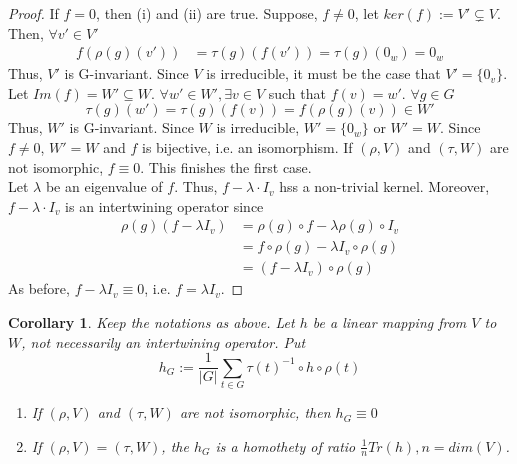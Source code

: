 \documentclass[letterpaper, leqno, 12pt]{article}
\providecommand{\abs}[1]{\left\lvert#1\right\rvert}
\newcommand {\repV} {(\rho,V)}
\newcommand {\repW} {(\tau,W)}
\theoremstyle{stdthm}
\newtheorem{cor}[thm]{Corollary}
\theoremstyle{stddef}
\theoremstyle{stdnonum}
\theoremstyle{stdqands}
\theoremstyle{stdbold}
\begin{document}
\begin{proof}
If $f=0$, then (i) and (ii) are true. Suppose, $f \neq 0$, let $ker(f) := V' \subsetneq V$. Then, $\forall v' \in V'$ 
\begin{align*}
f(\rho(g)(v')) &= \tau(g) (f(v')) = \tau(g)(0_w)= 0_w
\end{align*} 
Thus, $V'$ is G-invariant. Since $V$ is irreducible, it must be the case that $V' = \{0_v\}$. \\

\noindent Let $Im(f) = W' \subseteq W$. $\forall w' \in W', \exists v \in V$ such that $f(v) = w'$.  $\forall g\in G $
\[\tau(g)(w') = \tau(g)(f(v)) = f(\rho(g)(v)) \in W' \]
Thus, $W'$ is G-invariant. Since $W$ is irreducible, $W' = \{0_w\}$ or $W' = W$. Since $f\neq 0$, $W'=W$ and $f$ is bijective, i.e. an isomorphism. If $\repV$ and $\repW$ are not isomorphic, $f \equiv 0$. This finishes the first case. \\

\noindent Let $\lambda$ be an eigenvalue of $f$. Thus, $f-\lambda\cdot I_v$ hss a non-trivial kernel. Moreover, $f- \lambda \cdot I_v$ is an intertwining operator since 
\begin{align*}
\rho(g)(f - \lambda I_v) &= \rho(g)\circ f - \lambda \rho(g) \circ I_v\\
&= f \circ \rho(g) - \lambda I_v \circ \rho(g)\\
&= (f - \lambda I_v) \circ \rho(g) 
\end{align*}
As before, $f - \lambda I_v \equiv 0$, i.e. $f = \lambda I_v$. 
\end{proof}

\begin{cor}
Keep the notations as above. Let $h$ be a linear mapping from $V$ to $W$, not necessarily an intertwining operator. Put
\[h_G := \frac{1}{\abs{G}} \sum_{t\in G} \tau(t)^{-1} \circ h \circ \rho(t) \]

\begin{enumerate}
\item If $\repV$ and $\repW$ are not isomorphic, then $h_G \equiv 0$\\
\item If $\repV = \repW$, the $h_G$ is a homothety of ratio $\frac{1}{n} Tr(h), n = dim(V)$.  
\end{enumerate}
\end{cor}
\end{document}
